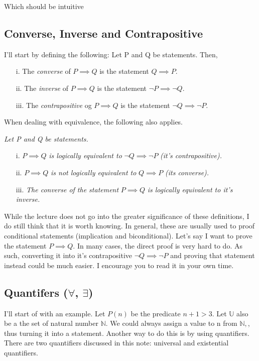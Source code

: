 \documentclass[a4paper]{article}
\begin{document}
\noindent Which should be intuitive

\subsection{Converse, Inverse and Contrapositive}
\noindent I'll start by defining the following: Let P and Q be statements. Then,
\begin{itemize}
	\item[i.] The \textit{converse} of $P \implies Q$ is the statement $Q \implies P$.
	\item[ii.] The \textit{inverse} of $P \implies Q$ is the statement $\neg P \implies \neg Q$.
	\item[iii.] The \textit{contrapositive} og $P \implies Q$ is the statement $\neg Q \implies \neg P$.
\end{itemize}
When dealing with equivalence, the following also applies.
\begin{tcolorbox}
	\textit{Let P and Q be statements.}
	\begin{itemize}
		\item[i.] $P \implies Q$ \textit{is logically equivalent to} $\neg Q \implies \neg P$ \textit{(it's contrapositive).}
		\item[ii.] $P \implies Q$ \textit{ is not logically equivalent to }$Q \implies P$ \textit{(its converse).}
		\item[iii.] \textit{The converse of the statement} $P \implies Q$ \textit{is logically equivalent to it's inverse.}
	\end{itemize}
\end{tcolorbox}

While the lecture does not go into the greater significance of these definitions, I do still think that it is worth knowing. In general, these are usually used to proof conditional statements (implication and biconditional). Let's say I want to prove the statement $P \implies Q$. In many cases, the direct proof is very hard to do. As such, converting it into it's contrapositive $\neg Q \implies \neg P$ and proving that statement instead could be much easier. I encourage you to read it in your own time.


\subsection{Quantifers ($\forall$, $\exists$)}
I'll start of with an example. Let $P\left( n \right) $ be the predicate $n + 1 > 3$. Let $\mathbb{U}$ also be a the set of natural number  $\mathbb{N}$. We could always assign a value to n from  $\mathbb{N},$, thus turning it into a statement. Another way to do this is by using quantifiers. There are two quantifiers discussed in this note: universal and existential quantifiers.
\end{document}
